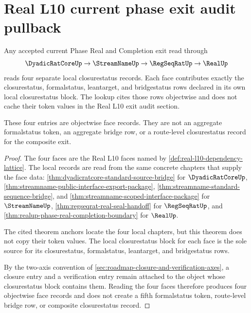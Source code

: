 \section{Real L10 current phase exit audit pullback}
\label{sec:real-l10-current-phase-exit-audit-pullback}

\begin{theorem}
\label{thm:real-l10-four-face-status-lookup}
Any accepted current Phase Real and Completion exit read through
$$
\DyadicRatCoreUp \to \StreamNameUp \to \RegSeqRatUp \to \RealUp
$$
reads four separate local closurestatus records. Each face contributes exactly
the closurestatus, formalstatus, leantarget, and bridgestatus rows declared in
its own local closurestatus block. The lookup cites those rows objectwise and
does not cache their token values in the Real L10 exit audit section.

These four entries are objectwise face records. They are not an aggregate
formalstatus token, an aggregate bridge row, or a route-level closurestatus
record for the composite exit.
\end{theorem}
\begin{proof}
The four faces are the Real L10 faces named by
\autoref{def:real-l10-dependency-lattice}. The local records are read from the
same concrete chapters that supply the face data:
\autoref{thm:dyadicratcore-standard-source-bridge} for
$\DyadicRatCoreUp$, \autoref{thm:streamname-public-interface-export-package},
\autoref{thm:streamname-standard-sequence-bridge}, and
\autoref{thm:streamname-scoped-interface-package} for $\StreamNameUp$,
\autoref{thm:regseqrat-real-seal-handoff} for $\RegSeqRatUp$, and
\autoref{thm:realup-phase-real-completion-boundary} for $\RealUp$.

The cited theorem anchors locate the four local chapters, but this theorem does
not copy their token values. The local closurestatus block for each face is the
sole source for its closurestatus, formalstatus, leantarget, and bridgestatus
rows.

By the two-axis convention of
\autoref{sec:roadmap-closure-and-verification-axes}, a closure entry and a
verification entry remain attached to the object whose closurestatus block
contains them. Reading the four faces therefore produces four objectwise face
records and does not create a fifth formalstatus token, route-level bridge row,
or composite closurestatus record.
\end{proof}

